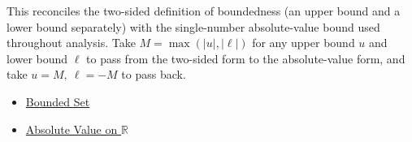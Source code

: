 \begin{remark*}[Interpretation]
This reconciles the two-sided definition of boundedness (an upper bound and
a lower bound separately) with the single-number absolute-value bound used
throughout analysis. Take $M=\max(|u|,|\ell|)$ for any upper bound $u$ and
lower bound $\ell$ to pass from the two-sided form to the absolute-value
form, and take $u=M,\ \ell=-M$ to pass back.
\end{remark*}

\begin{dependencies}
\begin{itemize}
  \item \hyperref[def:bounded]{Bounded Set}
  \item \hyperref[def:real-chapter-absolute-value-on-r]{Absolute Value on $\mathbb{R}$}
\end{itemize}
\end{dependencies}

